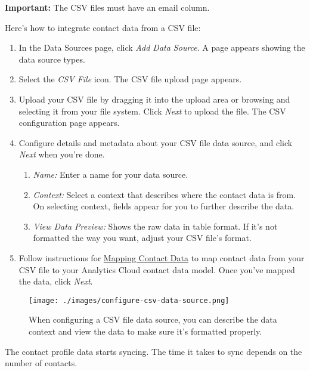 \textbf{Important:} The CSV files must have an email column.

Here's how to integrate contact data from a CSV file:

\begin{enumerate}
\def\labelenumi{\arabic{enumi}.}
\item
  In the Data Sources page, click \emph{Add Data Source}. A page appears
  showing the data source types.
\item
  Select the \emph{CSV File} icon. The CSV file upload page appears.
\item
  Upload your CSV file by dragging it into the upload area or browsing
  and selecting it from your file system. Click \emph{Next} to upload
  the file. The CSV configuration page appears.
\item
  Configure details and metadata about your CSV file data source, and
  click \emph{Next} when you're done.

  \begin{enumerate}
  \def\labelenumii{\arabic{enumii}.}
  \item
    \emph{Name:} Enter a name for your data source.
  \item
    \emph{Context:} Select a context that describes where the contact
    data is from. On selecting context, fields appear for you to further
    describe the data.
  \item
    \emph{View Data Preview:} Shows the raw data in table format. If
    it's not formatted the way you want, adjust your CSV file's format.
  \end{enumerate}
\item
  Follow instructions for
  \href{https://github.com/liferay/liferay-docs/blob/7.1.x/discover/analytics-cloud/articles/02-getting-started/04-mapping-contact-data.markdown}{Mapping
  Contact Data} to map contact data from your CSV file to your Analytics
  Cloud contact data model. Once you've mapped the data, click
  \emph{Next}.
\end{enumerate}

\begin{figure}
\centering
\texttt{[image: ./images/configure-csv-data-source.png]}
\caption{When configuring a CSV file data source, you can describe the
data context and view the data to make sure it's formatted properly.}
\end{figure}

The contact profile data starts syncing. The time it takes to sync
depends on the number of contacts.

